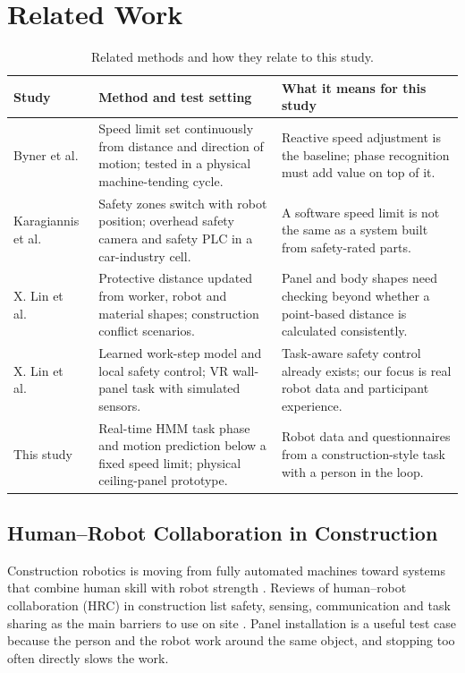 \documentclass{IEEEtran}
\begin{document}
\section{Related Work}
\begin{table}[!b]
\centering
\caption{Related methods and how they relate to this study.}
\label{tab:prior-work}
\footnotesize
\begin{tabular}{@{}p{}p{}p{}@{}}
\toprule
Study & Method and test setting & What it means for this study \\
\midrule
Byner et al.\ \cite{byner2019dynamic} & Speed limit set continuously from distance and direction of motion; tested in a physical machine-tending cycle. & Reactive speed adjustment is the baseline; phase recognition must add value on top of it. \\
Karagiannis et al.\ \cite{karagiannis2022adaptive} & Safety zones switch with robot position; overhead safety camera and safety PLC in a car-industry cell. & A software speed limit is not the same as a system built from safety-rated parts. \\
X. Lin et al.\ \cite{lin2025digitaltwin} & Protective distance updated from worker, robot and material shapes; construction conflict scenarios. & Panel and body shapes need checking beyond whether a point-based distance is calculated consistently. \\
X. Lin et al.\ \cite{lin2026semantic} & Learned work-step model and local safety control; VR wall-panel task with simulated sensors. & Task-aware safety control already exists; our focus is real robot data and participant experience. \\
This study & Real-time HMM task phase and motion prediction below a fixed speed limit; physical ceiling-panel prototype. & Robot data and questionnaires from a construction-style task with a person in the loop. \\
\bottomrule
\end{tabular}
\end{table}
\subsection{Human--Robot Collaboration in Construction}
Construction robotics is moving from fully automated machines toward systems
that combine human skill with robot strength
\cite{bock2015construction,zhang2023construction}. Reviews of human--robot
collaboration (HRC) in construction list safety, sensing, communication and
task sharing as the main barriers to use on site
\cite{wei2023construction,lin2025safety}. Panel installation is a useful test
case because the person and the robot work around the same object, and
stopping too often directly slows the work.
\end{document}
